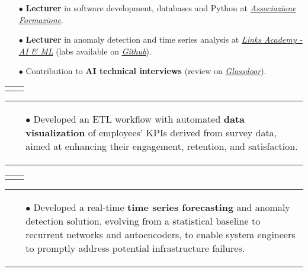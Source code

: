 \documentclass[11pt,a4paper,sans,english]{moderncv}
\makeatletter
\renewcommand*{\cventry}[6][.25em]{%
	\vspace{1.5mm}%
	\begin{tabular*}{\textwidth}{@{\extracolsep{\fill}}ll}%
		\ifthenelse{\equal{#3}{}}{}{\textbf{#3}} &
		\ifthenelse{\equal{#2}{}}{}{#4 #6 #2}\\%
	\end{tabular*}%
	\par\addvspace{#1}}
\newcommand*{\mycvitem}[2][.25em]{%
	\vspace{-.25em}%
	\begin{tabular}{@{}p{\textwidth}@{}}%
		\small#2%
	\end{tabular}%
	\par\addvspace{-0.7em}}
\newcommand*{\cvtag}[1]{%
	\textcolor{lightgray!50!black}{\fbox{\mathstrut\scriptsize\textsf{\textbf{#1}}}}}
\makeatother
\begin{document}
{\begin{itemize}
			\item[$\bullet$] \textbf{Lecturer} in software development, databases and Python at \href{https://www.associazioneformazione.it/formazione-professionale/ifts-tecnico-per-la-progettazione-e-lo-sviluppo-di-applicazioni-informatiche}{\textit{\underline{Associazione Formazione}}}.
			\item[$\bullet$] \textbf{Lecturer} in anomaly detection  and time series analysis at \href{https://academy.linksmt.it/corso-di-formazione-post-laurea-artificial-intelligence-machine-learning/}{\textit{\underline{Links Academy - AI \& ML}}} (labs available on \href{https://github.com/francesco-s/Links-Academy---Anomaly-Detection-Time-series-analysis}{\textit{\underline{Github}}}).
			\item[$\bullet$] Contribution to \textbf{AI technical interviews} (review on \href{https://www.glassdoor.it/Colloquio/Links-Management-and-Technology-Colloquio-RVW82686296.htm}{\textit{\underline{Glassdoor}}}).
	\end{itemize}}
	\vspace*{.25cm}
	
	\cventry{\scalebox{0.9}{\faCalendar\ 10/2022--02/2023}}{Artificial Intelligence and Data - Analyst}{\scalebox{0.9}{\faBuilding\ \href{https://www2.deloitte.com}{\textit{Deloitte}}}}{}{\scalebox{0.9}{\faMapMarker\ Bari}}{}
	\mycvitem{%
		\vspace*{-.6cm}
		\begin{flushleft}
			\noindent
			\cvtag{Qlik Sense} \cvtag{SQL} \cvtag{MS Excel} \cvtag{Qlik NPrinting}
		\end{flushleft}
		\vspace*{-.2cm}
		\begin{itemize}
			\item[$\bullet$] Developed an ETL workflow with automated \textbf{data visualization} of employees' KPIs derived from survey data, aimed at enhancing their engagement, retention, and satisfaction.
	\end{itemize}}
	
	\vspace*{.25cm}
	\cventry{\scalebox{0.9}{\faCalendar\ 12/2021--05/2022}}{AI engineer and System Administrator - Intern}{\scalebox{0.9}{\faBuilding\ \href{https://www.intesasanpaolo.com/}{\textit{Intesa Sanpaolo}}}}{}{\scalebox{0.9}{\faMapMarker\ Torino}}{}
	\mycvitem{%
		\vspace*{-.6cm}
		\begin{flushleft}
			\noindent
			\cvtag{Python} \cvtag{Tensorflow} \cvtag{Google Cloud Platform} \cvtag{Flask} \cvtag{Bokeh} \cvtag{Bash}
		\end{flushleft}
		\vspace*{-.2cm}
		\begin{itemize}
			\item[$\bullet$] Developed a real-time \textbf{time series forecasting} and anomaly detection solution, evolving from a statistical baseline to recurrent networks and autoencoders, to enable system engineers to promptly address potential infrastructure failures.
	\end{itemize}}
	
\end{document}
